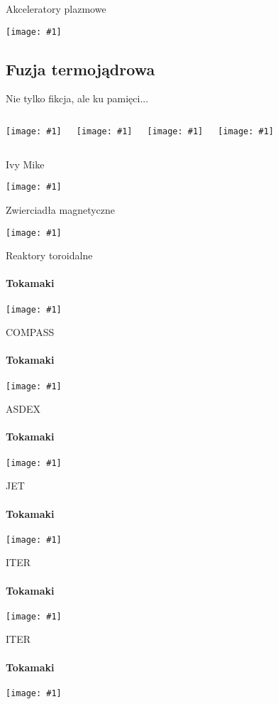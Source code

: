 \documentclass{beamer}
\newcommand {\framedgraphic}[1] {
        \begin{center}
            \texttt{[image: \#1]}
        \end{center}
}
\begin{document}
\begin{frame}[t]{Akceleratory plazmowe}
  \framedgraphic{img/plasmaaccelerator}
\end{frame}

\subsection{Fuzja termojądrowa}
\begin{frame}[t]{Nie tylko fikcja, ale ku pamięci...}
  \begin{columns}[c]
    \framedgraphic{img/spiderman2_fusion}
    \framedgraphic{img/mrfusion1}
    \framedgraphic{img/ironman_tokamak}
    \framedgraphic{img/interstellar}
  \end{columns}
\end{frame}

\begin{frame}[t]{Ivy Mike}
  \framedgraphic{img/IvyMike}
\end{frame}

\begin{frame}[t]{Zwierciadła magnetyczne}
  \framedgraphic{img/magmirror}
\end{frame}

\begin{frame}[t]{Reaktory toroidalne}
  \framesubtitle{Tokamaki}
  \framedgraphic{img/tokamak_scheme}
\end{frame}

\begin{frame}[t]{COMPASS}
  \framesubtitle{Tokamaki}
  \framedgraphic{img/compass}
\end{frame}

\begin{frame}[t]{ASDEX}
  \framesubtitle{Tokamaki}
  \framedgraphic{img/asdex}
\end{frame}

\begin{frame}[t]{JET}
  \framesubtitle{Tokamaki}
  \framedgraphic{img/jet}
\end{frame}

\begin{frame}[t]{ITER}
  \framesubtitle{Tokamaki}
  \framedgraphic{img/ITERsketch}
\end{frame}

\begin{frame}[t]{ITER}
  \framesubtitle{Tokamaki}
  \framedgraphic{img/IterPit}
\end{frame}
\end{document}

